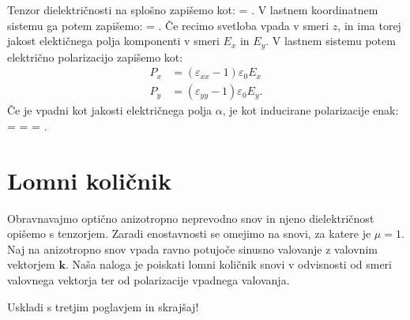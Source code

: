 Tenzor dielektričnosti na splošno zapišemo kot:
\beq
\underline{\varepsilon} = 
\!\!.
\eeq
V lastnem koordinatnem sistemu ga potem zapišemo:
\beq
\underline{\varepsilon} = 
\!\!.
\eeq
Če recimo svetloba vpada v smeri $z$, in ima torej jakost
elektičnega polja komponenti v smeri $E_x$ in $E_y$. 
V lastnem sistemu potem električno polarizacijo zapišemo kot:
\begin{align}
P_x &= (\varepsilon_{xx}-1) \varepsilon_0 E_x \\
P_y &= (\varepsilon_{yy}-1) \varepsilon_0 E_y.
\end{align}
Če je vpadni kot jakosti električnega polja $\alpha$, je kot
inducirane polarizacije enak:
\beq
\tan \beta =  = 
 = \tan \alpha.
\eeq

\section{Lomni količnik}
Obravnavajmo optično anizotropno neprevodno snov in njeno dielektričnost opišemo s tenzorjem. Zaradi
enostavnosti se omejimo na snovi, za katere je $\mu = 1$. Naj na anizotropno snov vpada
ravno potujoče sinusno valovanje z valovnim vektorjem $\mathbf{k}$. Naša naloga je poiskati
lomni količnik snovi v odvisnosti od smeri valovnega vektorja ter od polarizacije vpadnega
valovanja. 

Uskladi s tretjim poglavjem in skrajšaj!

